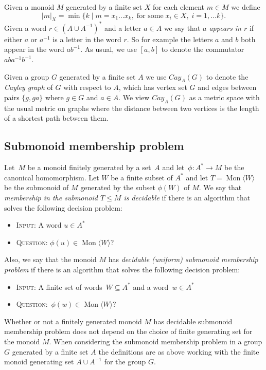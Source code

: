 \documentclass[11pt]{amsart}
\newcommand{\Mgen}[1]{\operatorname{Mon}\bigl\langle #1 \bigr\rangle}
\theoremstyle{plain}
\theoremstyle{definition}
\begin{document}
Given a monoid $M$ generated by a finite set $X$ for each element $m \in M$ we define
\[
|m|_X = \min\{ k \mid m = x_1 \ldots x_k, \; \mbox{for some} \; x_i \in X, \; i=1, \ldots k \}.
\]
Given a word $r \in (A \cup A^{-1})^*$ and a letter $a \in A$ we say that \emph{$a$ appears in $r$} if either $a$ or $a^{-1}$ is a letter in the word $r$. So for example the letters $a$ and $b$ both appear in the word $ab^{-1}$. As usual, we use $[a,b]$ to denote the commutator $aba^{-1}b^{-1}$.                

Given a group $G$ generated by a finite set $A$ we use $Cay_A(G)$ to denote the \emph{Cayley graph} of $G$ with respect to $A$, which has vertex set $G$ and edges between pairs $\{ g, ga \}$ where $g \in G$ and $a \in A$. We view $Cay_A(G)$ as a metric space with the usual metric on graphs where the distance between two vertices is the length of a shortest path between them.       


\subsection{Submonoid membership problem}
Let~$M$ be a monoid finitely generated by a set~$A$ and let~$\phi:A^* \rightarrow M$ be the canonical homomorphism. 
Let $W$ be a finite subset of $A^*$ and let $T = \Mgen{W}$ be the submonoid of $M$ generated by the subset $\phi(W)$ of $M$.   
We say that \emph{membership in the submonoid $T \leq M$ is decidable} if there is an algorithm that solves the following decision problem:    
\begin{itemize} 
\item{\textsc{Input}:} A word $u \in A^*$   
\item{\textsc{Question}:} $\phi(u) \in \Mgen{W}$?   
  \end{itemize}
Also, we say that the monoid $M$ has \emph{decidable (uniform) submonoid membership problem} if   
there is an algorithm that solves the following decision problem: 
\begin{itemize} 
\item{\textsc{Input}:} A finite set of words~$W \subseteq A^*$ and a word~$w \in A^*$   
\item{\textsc{Question}:}~$\phi(w) \in \Mgen{W}$?   
  \end{itemize}
Whether or not a finitely generated monoid $M$ has decidable submonoid membership problem 
does not depend on the choice of finite generating set for the monoid $M$.    
When considering the submonoid membership problem in a group $G$ generated by a finite set $A$ the definitions are as above working with the finite monoid generating set $A \cup A^{-1}$ for the group $G$.   
  
\end{document}
